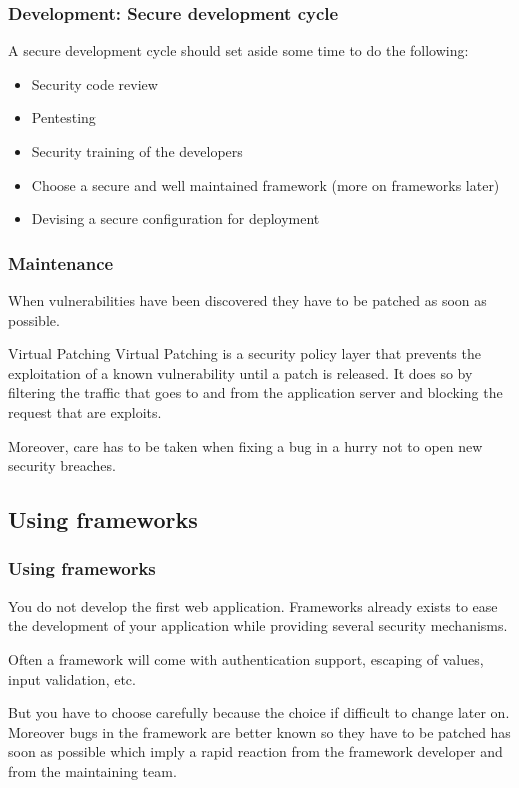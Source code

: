 \begin{frame}
\frametitle{Development: Secure development cycle}
A secure development cycle should set aside some time to do the
following:
\begin{itemize}
\item Security code review
\item Pentesting
\item Security training of the developers
\item Choose a secure and well maintained framework (more on
  frameworks later)
\item Devising a secure configuration for deployment
\end{itemize}

\end{frame}

\begin{frame}
\frametitle{Maintenance}
When vulnerabilities have been discovered they have to be patched as soon as
possible.

\begin{block}{Virtual Patching}
Virtual Patching is a security policy layer that prevents the exploitation of a known
vulnerability until a patch is released. It does so by filtering the
traffic that goes to and from the application server and blocking the
request that are exploits.
\end{block}

Moreover, care has to be taken when fixing a bug in a hurry not to open
new security breaches.

\end{frame}

\subsection{Using frameworks}

\begin{frame}
\frametitle{Using frameworks}

You do not develop the first web application. Frameworks already exists to
ease the development of your application while providing several security
mechanisms.

Often a framework will come with authentication support, escaping of values,
input validation, etc.

But you have to choose carefully because the choice if difficult to
change later on. Moreover bugs in the framework are better known so
they have to be patched has soon as possible which imply a rapid
reaction from the framework developer and from the maintaining team.
\end{frame}

